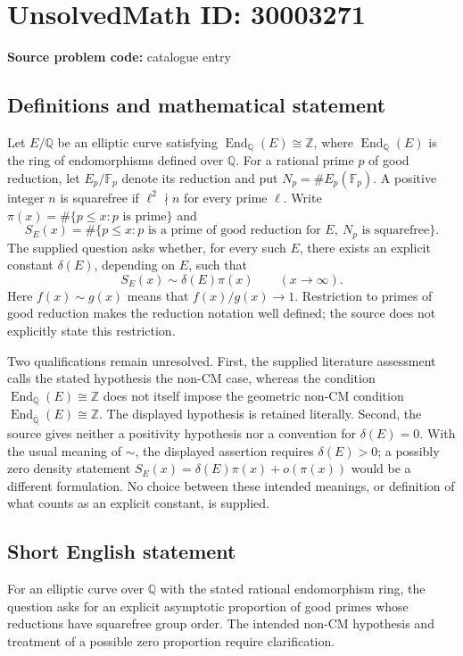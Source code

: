 \documentclass[11pt]{article}
\newcommand{\Z}{\mathbb{Z}}
\newcommand{\Q}{\mathbb{Q}}
\newcommand{\F}{\mathbb{F}}
\begin{document}
\section*{UnsolvedMath ID: 30003271}
\textbf{Source problem code:} catalogue entry
\subsection{Definitions and mathematical statement}
Let \(E/\Q\) be an elliptic curve satisfying \(\operatorname{End}_{\Q}(E)\cong\Z\), where \(\operatorname{End}_{\Q}(E)\) is the ring of endomorphisms defined over \(\Q\). For a rational prime \(p\) of good reduction, let \(E_p/\F_p\) denote its reduction and put \(N_p=\#E_p(\F_p)\). A positive integer \(n\) is squarefree if \(\ell^2\nmid n\) for every prime \(\ell\). Write \(\pi(x)=\#\{p\le x:p\text{ is prime}\}\) and
\[
S_E(x)=\#\{p\le x:p\text{ is a prime of good reduction for }E,\ N_p\text{ is squarefree}\}.
\]
The supplied question asks whether, for every such \(E\), there exists an explicit constant \(\delta(E)\), depending on \(E\), such that
\[
S_E(x)\sim\delta(E)\pi(x)\qquad(x\to\infty).
\]
Here \(f(x)\sim g(x)\) means that \(f(x)/g(x)\to1\). Restriction to primes of good reduction makes the reduction notation well defined; the source does not explicitly state this restriction.

Two qualifications remain unresolved. First, the supplied literature assessment calls the stated hypothesis the non-CM case, whereas the condition \(\operatorname{End}_{\Q}(E)\cong\Z\) does not itself impose the geometric non-CM condition \(\operatorname{End}_{\overline{\Q}}(E)\cong\Z\). The displayed hypothesis is retained literally. Second, the source gives neither a positivity hypothesis nor a convention for \(\delta(E)=0\). With the usual meaning of \(\sim\), the displayed assertion requires \(\delta(E)>0\); a possibly zero density statement \(S_E(x)=\delta(E)\pi(x)+o(\pi(x))\) would be a different formulation. No choice between these intended meanings, or definition of what counts as an explicit constant, is supplied.
\subsection{Short English statement}
For an elliptic curve over \(\Q\) with the stated rational endomorphism ring, the question asks for an explicit asymptotic proportion of good primes whose reductions have squarefree group order. The intended non-CM hypothesis and treatment of a possible zero proportion require clarification.
\end{document}
